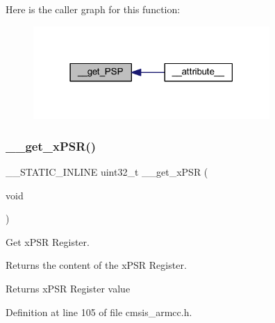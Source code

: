 Here is the caller graph for this function\+:
\nopagebreak
\begin{figure}[H]
\begin{center}
\leavevmode
\includegraphics[width=255pt]{group___c_m_s_i_s___core___reg_acc_functions_ga0c569cbb49336f8d638686f9103047aa_icgraph}
\end{center}
\end{figure}
\mbox{\label{group___c_m_s_i_s___core___reg_acc_functions_ga94c675a736d4754a5f73d8748b24aa11}} 
\subsubsection{\texorpdfstring{\+\_\+\+\_\+get\+\_\+x\+P\+S\+R()}{\_\_get\_xPSR()}}
{\footnotesize\ttfamily \+\_\+\+\_\+\+S\+T\+A\+T\+I\+C\+\_\+\+I\+N\+L\+I\+NE uint32\+\_\+t \+\_\+\+\_\+get\+\_\+x\+P\+SR (\begin{DoxyParamCaption}\item[{void}]{ }\end{DoxyParamCaption})}



Get x\+P\+SR Register. 

Returns the content of the x\+P\+SR Register. \begin{DoxyReturn}{Returns}
x\+P\+SR Register value 
\end{DoxyReturn}


Definition at line 105 of file cmsis\+\_\+armcc.\+h.


